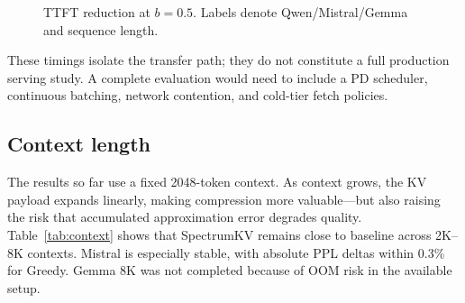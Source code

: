 \documentclass[11pt]{article}
\newcommand{\method}{SpectrumKV}
\newcommand{\budget}{b}
\newcommand{\pct}{\%}
\theoremstyle{plain}
\theoremstyle{definition}
\begin{document}
\begin{figure}[t]
\centering
{}
\caption{TTFT reduction at $\budget=0.5$.  Labels denote Qwen/Mistral/Gemma and sequence length.}
\label{fig:ttft}
\end{figure}

These timings isolate the transfer path; they do not constitute a full production serving study.  A complete evaluation would need to include a PD scheduler, continuous batching, network contention, and cold-tier fetch policies.

\subsection{Context length}
\label{sec:rq10}

The results so far use a fixed 2048-token context.  As context grows, the KV payload expands linearly, making compression more valuable---but also raising the risk that accumulated approximation error degrades quality.  Table~\ref{tab:context} shows that \method{} remains close to baseline across 2K--8K contexts.  Mistral is especially stable, with absolute PPL deltas within 0.3\pct{} for Greedy.  Gemma 8K was not completed because of OOM risk in the available setup.
\end{document}
